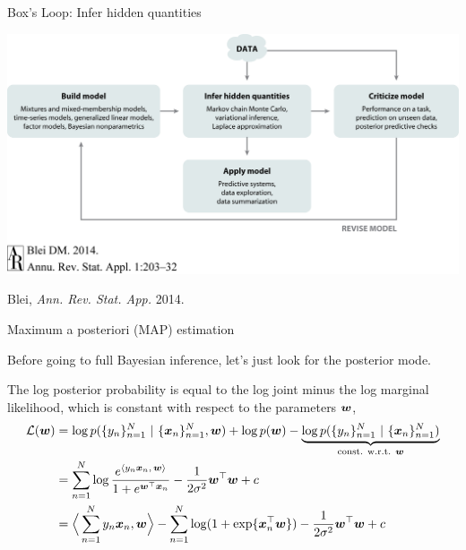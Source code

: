 \documentclass[aspectratio=169]{beamer}
\begin{document}
\begin{frame}{Box's Loop: Infer hidden quantities}
\begin{center}
\includegraphics[width=.85\linewidth]{figures/lap1/boxsloop.jpeg}\\
\end{center} 
\begin{flushright}
{\footnotesize Blei, \textit{Ann. Rev. Stat. App.} 2014.}
\end{flushright}
\end{frame}


\begin{frame}{Maximum a posteriori (MAP) estimation}

Before going to full Bayesian inference, let's just look for the posterior mode.

The log posterior probability is equal to the log joint minus the log marginal likelihood, which is constant with respect to the parameters $\boldsymbol{w}$,
\begin{align}
    \mathcal{L}(\boldsymbol{w}) &= \log p(\{y_n\}_{n=1}^N ~\vert~ \{\boldsymbol{x}_n\}_{n=1}^N, \boldsymbol{w}) + \log p(\boldsymbol{w}) - \underbrace{\log p(\{y_n\}_{n=1}^N ~\vert~ \{\boldsymbol{x}_n\}_{n=1}^N)}_{\text{const. w.r.t. } \boldsymbol{w}} \\
    &= \sum_{n=1}^N \log \frac{e^{\langle y_n \boldsymbol{x}_n, \, \boldsymbol{w} \rangle}}{1+e^{\boldsymbol{w}^\top \boldsymbol{x}_n}} -\frac{1}{2\sigma^2} \boldsymbol{w}^\top \boldsymbol{w} + c\\
    &= \Big \langle \sum_{n=1}^N y_n \boldsymbol{x}_n, \boldsymbol{w} \Big \rangle 
    - \sum_{n=1}^N \log (1 + \exp \{\boldsymbol{x}_n^\top \boldsymbol{w} \}) - \frac{1}{2\sigma^2} \boldsymbol{w}^\top \boldsymbol{w} + c
\end{align}

\end{frame}
\end{document}
